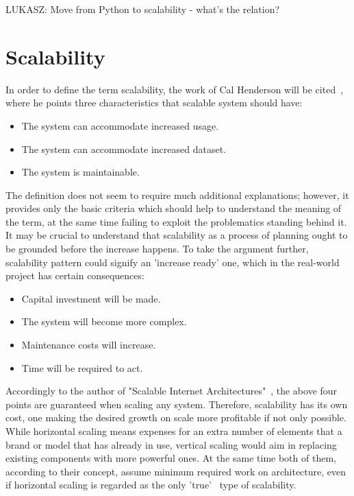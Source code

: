 LUKASZ: Move from Python to scalability - what's the relation? 

\section{Scalability}\label{sec:scalability}
In order to define the term scalability, the work of Cal Henderson will be cited~\cite[pages 203--204]{build_scalable}, where he points three characteristics that scalable system should have:
\begin{itemize}
\item{The system can accommodate increased usage.}
\item{The system can accommodate increased dataset.}
\item{The system is maintainable.}
\end{itemize}
The definition does not seem to require much additional explanations; however, it provides only the basic criteria which should help to understand the meaning of the term, at the same time failing to exploit the problematics standing behind it. It may be crucial to understand that scalability as a process of planning ought to be grounded before the increase happens. To take the argument further, scalability pattern could signify an 'increase ready' one, which in the real-world project has certain consequences:
\begin{itemize}
\item{Capital investment will be made.}
\item{The system will become more complex.}
\item{Maintenance costs will increase.}
\item{Time will be required to act.}
\end{itemize}
Accordingly to the author of  "Scalable Internet Architectures"~\cite[page 8]{scalable_arch}, the above four points are guaranteed when scaling any system. Therefore, scalability has its own cost, one making the desired growth on scale more profitable if not only possible. While horizontal scaling means expenses for an extra number of elements that a brand or model that has already in use, vertical scaling would aim in replacing existing components with more powerful ones. At the same time both of them, according to their concept, assume minimum required work on architecture, even if horizontal scaling is regarded as the only 'true'~\cite[page 5]{scalable_arch} type of scalability. 

